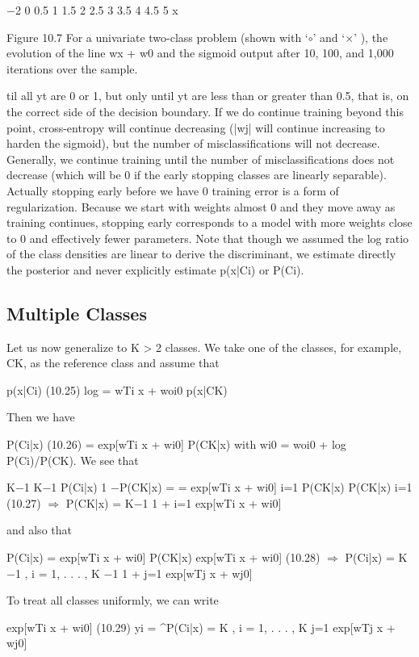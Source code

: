 $-$2 0 0.5 1 1.5 2 2.5 3 3.5 4 4.5 5 x

Figure 10.7 For a univariate two-class problem (shown with ‘$\circ$’ and ‘$\times$’ ), the evolution of the line wx + w0 and the sigmoid output after 10, 100, and 1,000 iterations over the sample.

til all yt are 0 or 1, but only until yt are less than or greater than 0.5, that is, on the correct side of the decision boundary. If we do continue training beyond this point, cross-entropy will continue decreasing (|wj| will continue increasing to harden the sigmoid), but the number of misclassifications will not decrease. Generally, we continue training until the number of misclassifications does not decrease (which will be 0 if the early stopping classes are linearly separable). Actually stopping early before we have 0 training error is a form of regularization. Because we start with weights almost 0 and they move away as training continues, stopping early corresponds to a model with more weights close to 0 and effectively fewer parameters. Note that though we assumed the log ratio of the class densities are linear to derive the discriminant, we estimate directly the posterior and never explicitly estimate p(x|Ci) or P(Ci).

\subsection{Multiple Classes}

Let us now generalize to K > 2 classes. We take one of the classes, for example, CK, as the reference class and assume that

p(x|Ci) (10.25) log = wTi x + woi0 p(x|CK)

Then we have

P(Ci|x) (10.26) = exp[wTi x + wi0] P(CK|x) with wi0 = woi0 + log P(Ci)/P(CK). We see that

K$-$1 K$-$1 P(Ci|x) 1 $-$P(CK|x) = = exp[wTi x + wi0] i=1 P(CK|x) P(CK|x) i=1 (10.27) $\Rightarrow$ P(CK|x) = K$-$1 1 + i=1 exp[wTi x + wi0]

and also that

P(Ci|x) = exp[wTi x + wi0] P(CK|x) exp[wTi x + wi0] (10.28) $\Rightarrow$ P(Ci|x) = K$-$1 , i = 1, . . . , K $-$1 1 + j=1 exp[wTj x + wj0]

To treat all classes uniformly, we can write

exp[wTi x + wi0] (10.29) yi = \textasciicircum{}P(Ci|x) = K , i = 1, . . . , K j=1 exp[wTj x + wj0]

